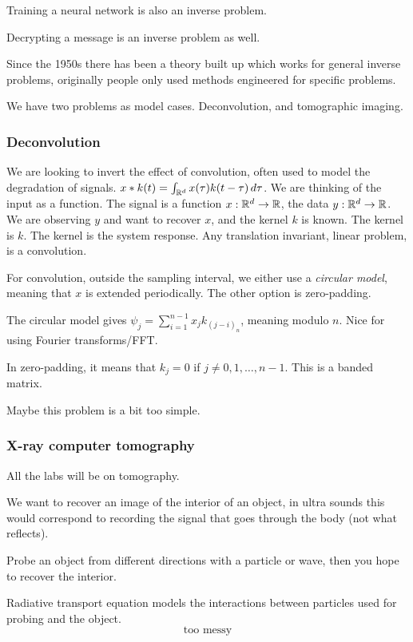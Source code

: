 \documentclass[12pt]{article}
\begin{document}
Training a neural network is also an inverse problem.

Decrypting a message is an inverse problem as well.

Since the 1950s there has been a theory built up which works for general inverse problems, originally people only used methods engineered for specific problems.

We have two problems as model cases. Deconvolution, and tomographic imaging.

\subsubsection{Deconvolution}
We are looking to invert the effect of convolution, often used to model the degradation of signals. $x*k(t)= \int_{\mathbb{R}^d} x(\tau)k(t-\tau) \,d\tau $. We are thinking of the input as a function. The signal is a function $x:\mathbb{R}^d\to\mathbb{R}$, the data $y:\mathbb{R}^d\to\mathbb{R}$. We are observing $y$ and want to recover $x$, and the kernel $k$ is known. The kernel is $k$. The kernel is the system response. Any translation invariant, linear problem, is a convolution.

For convolution, outside the sampling interval, we either use a \textit{circular model}, meaning that $x$ is extended periodically. The other option is zero-padding.

The circular model gives $\psi_j= \sum_{i=1}^{n-1} x_jk_{(j-i)_n}$, meaning modulo $n$. Nice for using Fourier transforms/FFT.

In zero-padding, it means that $k_j=0$ if $j\neq 0,1,\dots,n-1$. This is a banded matrix.

Maybe this problem is a bit too simple.
\subsubsection{X-ray computer tomography}
All the labs will be on tomography.

We want to recover an image of the interior of an object, in ultra sounds this would correspond to recording the signal that goes through the body (not what reflects). 

Probe an object from different directions with a particle or wave, then you hope to recover the interior. 

Radiative transport equation models the interactions between particles used for probing and the object.
\begin{equation*}
    \text{too messy}
\end{equation*}
\end{document}
